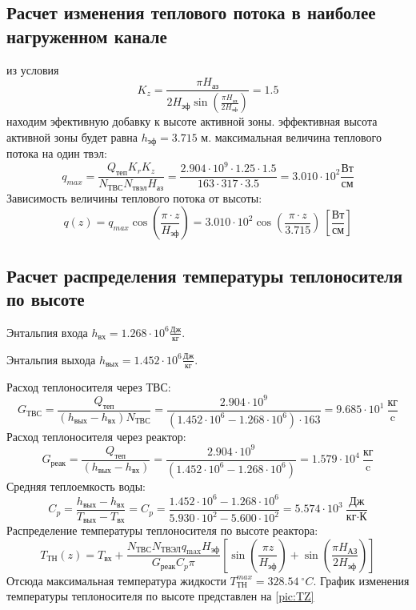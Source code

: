\subsection{Расчет изменения теплового потока в наиболее нагруженном канале}
из условия $$
K_z = \frac {\pi H_{\text{аз}}} {2 H_{\text{эф}} \sin \left(\frac {\pi H_{\text{аз}}}{2H_{\text{эф}}}\right)}  = 1.5
$$ 
находим эфективную добавку к высоте активной зоны. эффективная высота активной зоны будет равна $h_{\text{эф}} = 3.715$ м. максимальная величина теплового потока на один твэл:
\begin{equation}
q_{max} = \frac {Q_{\text{теп}}K_r K_z}{N_{\text{ТВС}}N_{\text{твэл}}H_{\text{аз}}}  
=
\frac 
{ 2.904 \cdot 10^{ 9 } \cdot 1.25 \cdot 1.5  }
{ 163 \cdot 317 \cdot 3.5 }
=3.010 \cdot 10^{ 2 } \frac {\text{Вт}} {\text{см}}
\end{equation}
Зависимость величины теплового потока от высоты:
$$
q(z) = q_{max}\cos\left(\frac {\pi\cdot z} {H_{\text{эф}}}\right) = 3.010 \cdot 10^{ 2 }\cos \left(\frac {\pi \cdot z} {3.715} \right)\ \left[\frac{\text{Вт}}{\text{см}} \right]
$$

\subsection{Расчет распределения температуры теплоносителя по высоте}

Энтальпия входа $h_{\text{вх}} =1.268 \cdot 10^6 \frac{Дж}{кг}$.%

\noindent Энтальпия выхода $h_{\text{вых}} =1.452 \cdot 10^6 \frac{Дж}{кг}$. %

\noindent Расход теплоносителя через ТВС:
$$
G_{\text{ТВС}} = \frac {Q_{\text{теп}}} {(h_{\text{вых}} - h_{\text{вх}})N_{\text{ТВС}}}
=
\frac { 2.904 \cdot 10^{ 9 } } { ( 1.452 \cdot 10^{ 6 } - 1.268 \cdot 10^{ 6 }) \cdot 163 } = 9.685 \cdot 10^{ 1 } \ \frac {\text{кг}}{\text{c}}
$$
Расход теплоносителя через реактор:
$$
G_{\text{реак}} = \frac {Q_{\text{теп}}} {(h_{\text{вых}} - h_{\text{вх}})}
=
\frac { 2.904 \cdot 10^{ 9 } } { ( 1.452 \cdot 10^{ 6 } - 1.268 \cdot 10^{ 6 }) } = 1.579 \cdot 10^{ 4 } \ \frac {\text{кг}}{\text{c}}
$$
Средняя теплоемкость воды:
$$
C_p = \frac {h_{\text{вых}} - h_{\text{вх}}} {T_{\text{вых}} - T_{\text{вх}}}
=
C_p = \frac { 1.452 \cdot 10^{ 6 } - 1.268 \cdot 10^{ 6 } } { 5.930 \cdot 10^{ 2 } - 5.600 \cdot 10^{ 2 } } = 5.574 \cdot 10^{ 3 } \ \frac{ \text{Дж}} { \text{кг} \cdot \text{К} }
$$
\noindent Распределение температуры теплоносителя по высоте реактора:
$$
T_{ТН}(z) = T_{\text{вх}} + \frac {N_{\text{ТВС}}N_{\text{ТВЭЛ}}q_{\max}H_{\text{эф}}} {G_{\text{реак}}C_p\pi}\left[\sin \left(\frac {\pi z}{H_{\text{эф}}} \right) +\sin \left(\frac {\pi H_{\text{АЗ}}} {2H_{\text{эф}}} \right) \right]
$$
\noindent Отсюда максимальная температура жидкости $T_{\text{ТН}}^{max} = 328.54\  ^\circ C$.
График изменения температуры теплоносителя по высоте представлен на \ref{pic:TZ}

